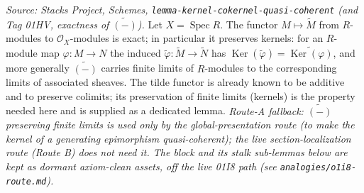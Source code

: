 \begin{lemma}
  \label{lem:tilde_preserves_kernels}
  \textit{Source: Stacks Project, Schemes,
  \texttt{lemma-kernel-cokernel-quasi-coherent} (and Tag 01HV, exactness of
  \(\widetilde{(-)}\)).}
  Let \(X = \operatorname{Spec} R\). The functor \(M \mapsto \widetilde{M}\) from
  \(R\)-modules to \(\mathcal{O}_X\)-modules is exact; in particular it preserves
  kernels: for an \(R\)-module map \(\varphi : M \to N\) the induced
  \(\widetilde{\varphi} : \widetilde{M} \to \widetilde{N}\) has
  \(\operatorname{Ker}(\widetilde{\varphi}) = \widetilde{\operatorname{Ker}(\varphi)}\),
  and more generally \(\widetilde{(-)}\) carries finite limits of \(R\)-modules to the
  corresponding limits of associated sheaves. The tilde functor is already known to be
  additive and to preserve colimits; its preservation of finite limits (kernels) is the
  property needed here and is supplied as a dedicated lemma.
  \emph{Route-A fallback: \(\widetilde{(-)}\) preserving finite limits is used only by the
  global-presentation route (to make the kernel of a generating epimorphism quasi-coherent); the live
  section-localization route (Route B) does not need it. The block and its stalk sub-lemmas below are
  kept as dormant axiom-clean assets, off the live 01I8 path (see \texttt{analogies/o1i8-route.md}).}
\end{lemma}

